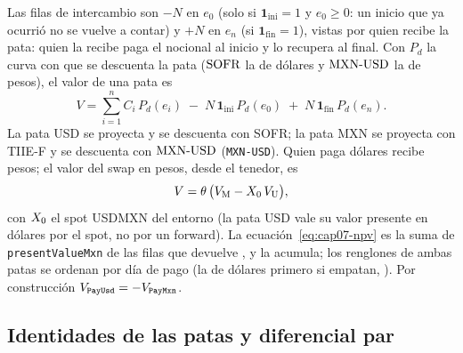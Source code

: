 Las filas de intercambio son $-N$ en $e_0$ (solo si $\mathbf 1_{\mathrm{ini}}=1$ y $e_0\ge0$: un inicio que ya
ocurrió no se vuelve a contar) y $+N$ en $e_n$ (si $\mathbf 1_{\mathrm{fin}}=1$), vistas por quien recibe la
pata: quien la recibe paga el nocional al inicio y lo recupera al final. Con $P_d$ la curva con que se descuenta
la pata ($\mathrm{SOFR}$ la de dólares y $\mathrm{MXN\text{-}USD}$ la de pesos), el valor de una pata es
\begin{equation}\label{eq:cap07-pata}
  V = \sum_{i=1}^{n} C_i\,P_d(e_i) \;-\; N\,\mathbf 1_{\mathrm{ini}}\,P_d(e_0) \;+\; N\,\mathbf 1_{\mathrm{fin}}\,P_d(e_n) .
\end{equation}
La pata USD se proyecta y se descuenta con SOFR; la pata MXN se proyecta con TIIE-F y se descuenta con
$\mathrm{MXN\text{-}USD}$ (\texttt{MXN-USD}). Quien paga dólares recibe pesos; el valor del swap en pesos, desde el tenedor, es
\begin{equation}\label{eq:cap07-npv}
  V = \theta\,\bigl(V_{\mathrm M} - X_0\,V_{\mathrm U}\bigr),
\end{equation}
con $X_0$ el spot USDMXN del entorno (la pata USD vale su valor presente en dólares por el spot, no por un
forward). La ecuación~\eqref{eq:cap07-npv} es la suma de \texttt{presentValueMxn} de las filas que devuelve
, y 
la acumula; los renglones de ambas patas se ordenan por día de pago (la de dólares primero si empatan,
). Por construcción
$V_{\texttt{PayUsd}}=-V_{\texttt{PayMxn}}$.

\subsection{Identidades de las patas y diferencial par}\label{sec:cap07-identidades}

